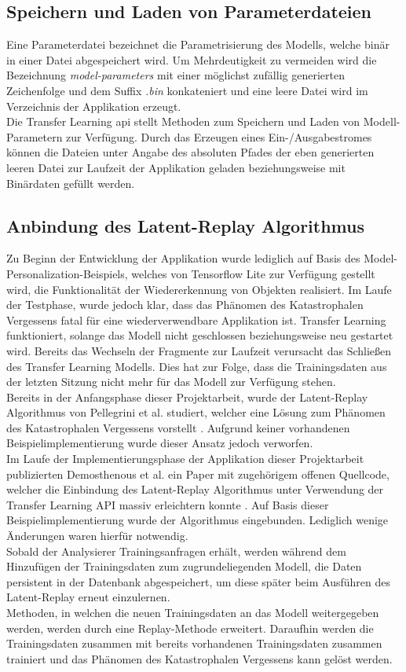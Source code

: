 \documentclass[oneside]{ausarbeitung}
\begin{document}
\subsection{Speichern und Laden von Parameterdateien}
Eine Parameterdatei bezeichnet die Parametrisierung des Modells, welche binär in einer Datei abgespeichert wird. Um Mehrdeutigkeit zu vermeiden wird die Bezeichnung \textit{model-parameters} mit einer möglichst zufällig generierten Zeichenfolge und dem Suffix \textit{.bin} konkateniert und eine leere Datei wird im Verzeichnis der Applikation erzeugt.\\
Die Transfer Learning \ac{api} stellt Methoden zum Speichern und Laden von Modell-Parametern zur Verfügung. Durch das Erzeugen eines Ein-/Ausgabestromes können die Dateien unter Angabe des absoluten Pfades der eben generierten leeren Datei zur Laufzeit der Applikation geladen beziehungsweise mit Binärdaten gefüllt werden.
\subsection{Anbindung des Latent-Replay Algorithmus}
Zu Beginn der Entwicklung der Applikation wurde lediglich auf Basis des Model-Personalization-Beispiels, welches von Tensorflow Lite zur Verfügung gestellt wird, die Funktionalität der Wiedererkennung von Objekten realisiert. Im Laufe der Testphase, wurde jedoch klar, dass das Phänomen des Katastrophalen Vergessens fatal für eine wiederverwendbare Applikation ist. Transfer Learning funktioniert, solange das Modell nicht geschlossen beziehungsweise neu gestartet wird. Bereits das Wechseln der Fragmente zur Laufzeit verursacht das Schließen des Transfer Learning Modells. Dies hat zur Folge, dass die Trainingsdaten aus der letzten Sitzung nicht mehr für das Modell zur Verfügung stehen.\\
Bereits in der Anfangsphase dieser Projektarbeit, wurde der Latent-Replay Algorithmus von Pellegrini et al. studiert, welcher eine Lösung zum Phänomen des Katastrophalen Vergessens vorstellt \cite{Pellegrini2019}. Aufgrund keiner vorhandenen Beispielimplementierung wurde dieser Ansatz jedoch verworfen.\\
Im Laufe der Implementierungsphase der Applikation dieser Projektarbeit publizierten Demosthenous et al. ein Paper mit zugehörigem offenen Quellcode, welcher die Einbindung des Latent-Replay Algorithmus unter Verwendung der Transfer Learning API massiv erleichtern konnte \cite{cl-vs-tl}. Auf Basis dieser Beispielimplementierung wurde der Algorithmus eingebunden. Lediglich wenige Änderungen waren hierfür notwendig.\\
Sobald der Analysierer Trainingsanfragen erhält, werden während dem Hinzufügen der Trainingsdaten zum zugrundeliegenden Modell, die Daten persistent in der Datenbank abgespeichert, um diese später beim Ausführen des Latent-Replay erneut einzulernen.\\
Methoden, in welchen die neuen Trainingsdaten an das Modell weitergegeben werden, werden durch eine Replay-Methode erweitert. Daraufhin werden die Trainingsdaten zusammen mit bereits vorhandenen Trainingsdaten zusammen trainiert und das Phänomen des Katastrophalen Vergessens kann gelöst werden.
\end{document}

